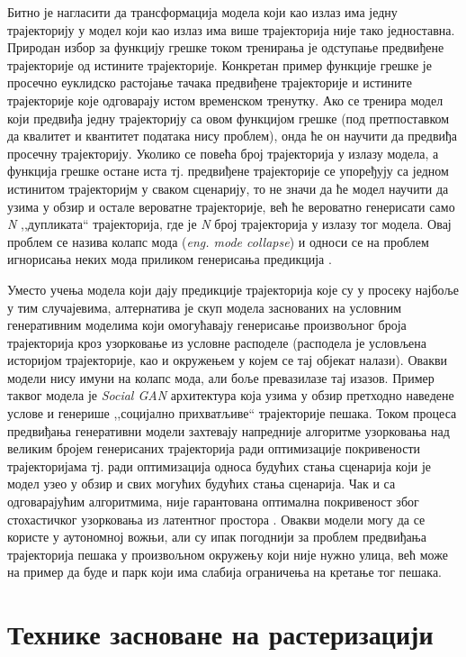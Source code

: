 \documentclass[11pt,oneside]{memoir}
\begin{document}
Битно је нагласити да трансформација модела који као излаз има једну трајекторију у модел који као излаз има више трајекторија није тако једноставна.
Природан избор за функцију грешке током тренирања је одступање предвиђене трајекторије од истините трајекторије. Конкретан пример
функције грешке је просечно еуклидско растојање тачака предвиђене трајекторије и истините трајекторије које одговарају истом временском тренутку. Ако
се тренира модел који предвиђа једну трајекторију са овом функцијом грешке (под претпоставком да квалитет и квантитет података нису проблем), 
онда ће он научити да предвиђа просечну трајекторију. Уколико се повећа број трајекторија у излазу модела, а функција грешке остане иста тј. предвиђене
трајекторије се упоређују са једном истинитом трајекторијм у сваком сценарију, то не значи да ће модел научити да узима у обзир и остале
вероватне трајекторије, већ ће вероватно генерисати само \textit{N} ,,дупликата`` трајекторија, где је \textit{N} број трајекторија у излазу 
тог модела. Овај проблем се назива колапс мода (\textit{eng. mode collapse}) и односи се на проблем игнорисања неких мода приликом генерисања предикција
\cite{overcoming_mode_collapse}.

Уместо учења модела који дају предикције трајекторија које су у просеку најбоље у тим случајевима, 
алтернатива је скуп модела заснованих на условним генеративним моделима који
омогућавају генерисање произвољног броја трајекторија кроз узорковање из условне расподеле 
(расподела је условљена историјом трајекторије, као и окружењем у којем се тај објекат налази). Овакви модели нису имуни на колапс мода,
али боље превазилазе тај изазов.
Пример таквог модела је \textit{Social GAN} \cite{social_gan} архитектура која узима у обзир претходно наведене услове и генерише ,,социјално прихватљиве`` 
трајекторије пешака. Током процеса предвиђања генеративни модели захтевају напредније алгоритме узорковања над великим бројем генерисаних
трајекторија ради оптимизације покривености трајекторијама тј. ради оптимизација 
односа будућих стања сценарија који је модел узео у обзир и свих могућих будућих стања сценарија. Чак и са одговарајућим алгоритмима,
није гарантована оптимална покривеност због стохастичког узорковања из латентног простора \cite{tnt}. Овакви модели могу да се користе
у аутономној вожњи, али су ипак погоднији за
проблем предвиђања трајекторија пешака у произвољном окружењу који није нужно улица, већ може на пример да буде и парк који има слабија ограничења
на кретање тог пешака.

\section{Технике засноване на растеризацији}
\end{document}
